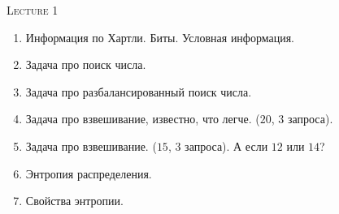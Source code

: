 \centerline{\textsc{Lecture 1}}

\begin{enumerate}
    \item Информация по Хартли. Биты. Условная информация.
    \item Задача про поиск числа.
    \item Задача про разбалансированный поиск числа. 
    \item Задача про взвешивание, известно, что легче. ($20$, $3$ запроса).
    \item Задача про взвешивание. ($15$, $3$ запроса). А если $12$ или $14$?
    \item Энтропия распределения.
    \item Свойства энтропии.
\end{enumerate}

